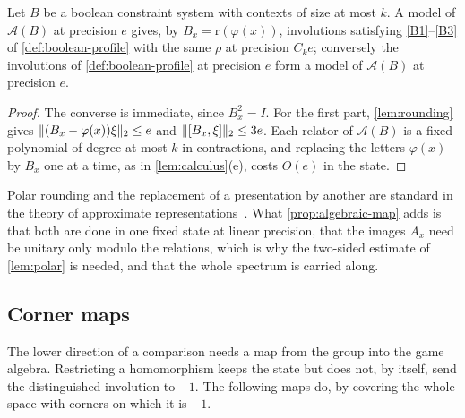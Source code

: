 \begin{lemma}\label{lem:boolean-models}
Let $B$ be a boolean constraint system with contexts of size at most $k$. A model of $\mathcal A(B)$ at precision $e$ gives,
by $B_x=\mathrm r(\varphi(x))$, involutions satisfying \ref{B1}--\ref{B3} of \cref{def:boolean-profile} with the same $\rho$ at
precision $C_ke$; conversely the involutions of \cref{def:boolean-profile} at precision $e$ form a model of $\mathcal A(B)$ at
precision $e$.
\end{lemma}

\begin{proof}
The converse is immediate, since $B_x^2=I$. For the first part, \cref{lem:rounding} gives $\lVert (B_x-\varphi(x))\xi\rVert_2\le e$
and $\lVert [B_x,\xi]\rVert_2\le3e$. Each relator of $\mathcal A(B)$ is a fixed polynomial of degree at most $k$ in contractions, and
replacing the letters $\varphi(x)$ by $B_x$ one at a time, as in \cref{lem:calculus}(e), costs $O(e)$ in the state.
\end{proof}

Polar rounding and the replacement of a presentation by another are standard in the theory of approximate
representations~\cite{SV18}. What \cref{prop:algebraic-map} adds is that both are done in one fixed state at linear
precision, that the images $A_x$ need be unitary only modulo the relations, which is why the two-sided estimate of
\cref{lem:polar} is needed, and that the whole spectrum is carried along.

\subsection{Corner maps}\label{sec:compile-corner}

The lower direction of a comparison needs a map from the group into the game algebra. Restricting a homomorphism keeps the
state but does not, by itself, send the distinguished involution to $-1$. The following maps do, by covering the
whole space with corners on which it is $-1$.

